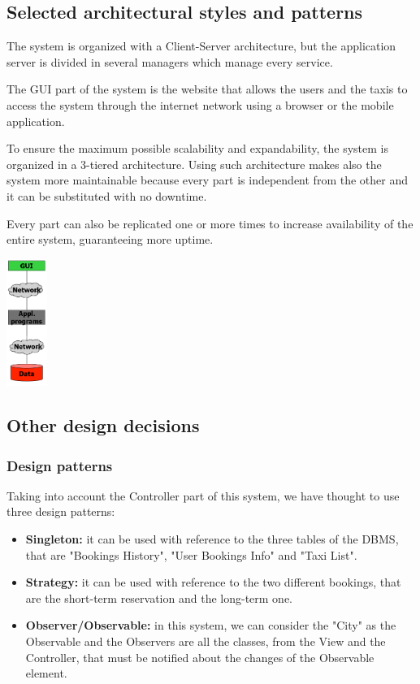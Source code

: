 \subsection{Selected architectural styles and patterns}
	The system is organized with a Client-Server architecture, but the application server is divided in several managers which manage every service. 
	
	The GUI part of the system is the website that allows the users and the taxis to access the system through the internet network using a browser or the mobile application.
	
	To ensure the maximum possible scalability and expandability, the system is organized in a 3-tiered architecture. Using such architecture makes also the system more maintainable because every part is independent from the other and it can be substituted with no downtime.
	
	Every part can also be replicated one or more times to increase availability of the entire system, guaranteeing more uptime.
	\begin{center}	
	    	\includegraphics[width=0.10\textwidth]{./images/architecture.png}
	\end{center}	  	
\subsection{Other design decisions}
	\subsubsection{Design patterns}
	Taking into account the Controller part of this system, we have thought to use three design patterns:
		\begin{itemize}
			\item \textbf{Singleton:} it can be used with reference to the three tables of the DBMS, that are "Bookings History", "User Bookings Info" and "Taxi List".
			\item \textbf{Strategy:} it can be used with reference to the two different bookings, that are the short-term reservation and the long-term one.
			\item \textbf{Observer/Observable:} in this system, we can consider the "City" as the Observable and the Observers are all the classes, from the View and the Controller, that must be notified about the changes of the Observable element.
		\end{itemize}
		
		
		
		
		
		
		
		
		
		
		
		
		
		
		
		
		
		
		
		
		
		
		
		
		
		
		
	
	
	
	
	
	